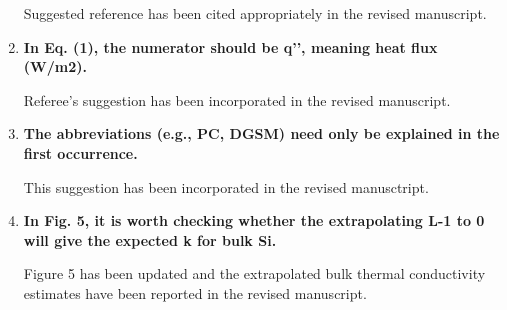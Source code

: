 \documentclass[12pt]{article}
\begin{document}
\begin{enumerate}[leftmargin=*,itemsep=24pt]
Suggested reference has been cited appropriately in the revised manuscript. 

\item \textbf{In Eq. (1), the numerator should be q’’, meaning heat flux (W/m2).}

Referee's suggestion has been incorporated in the revised manuscript. 

\item \textbf{The abbreviations (e.g., PC, DGSM) need only be explained in the first occurrence.}

This suggestion has been incorporated in the revised manusctript. 

\item \textbf{In Fig. 5, it is worth checking whether the extrapolating L-1 to 0 will give the expected k for bulk Si.}

Figure 5 has been updated and the extrapolated bulk thermal conductivity estimates have been reported in the
revised manuscript. 

\end{enumerate}

%
%
\end{document}
